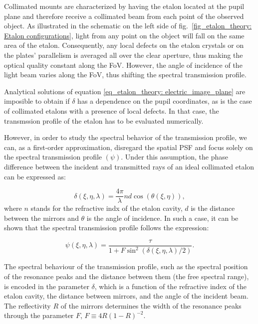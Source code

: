 Collimated mounts are characterized by having the etalon located at the pupil plane and therefore receive a collimated beam from each point of the observed object. As illustrated in the schematic on the left side of fig.~{\ref{fig_etalon_theory: Etalon configurations}}, light from any point on the object will fall on the same area of the etalon. Consequently, any local defects on the etalon crystals or on the plates' parallelism is averaged all over the clear aperture, thus making the optical quality constant along the FoV. However, the angle of incidence of the light beam varies along the FoV, thus shifting the spectral transmission profile.  

Analytical solutions of equation \eqref{eq_etalon_theory: electric_image_plane} are imposible to obtain if $\delta$ has a dependence on the pupil coordinates, as is the case of collimated etalons with a presence of local defects. In that case, the transmssion profile of the etalon has to be evaluated numerically. 

However, in order to study the spectral behavior of the transmission profile, we can, as a first-order approximation, disregard the spatial PSF and focus solely on the spectral transmission profile $(\psi)$. Under this assumption, the phase difference between the incident and transmitted rays of an ideal collimated etalon can be expressed as:  

\begin{equation}
  \delta (\xi, \eta, \lambda) = \frac{4\pi}{\lambda}nd\cos (\theta(\xi, \eta)),
  \label{eq_etalon_theory: collimated_delta}
\end{equation}
where $n$ stands for the refractive indx of the etalon cavity, $d$ is the distance between the mirrors and $\theta$ is the angle of incidence. In such a case, it can be shown that the spectral transmission profile follows the expression: 

\begin{equation}
  \psi\left(\xi, \eta, \lambda \right) = \frac{\tau}{1 + F \sin ^2 (\delta(\xi, \eta, \lambda) / 2)}.
  \label{eq_eta_theory : Collimated_profile}
\end{equation}

The spectral behaviour of the transmission profile, such as the spectral position of the resonance peaks and the distance between them (the free spectral range), is encoded in the parameter $\delta$, which is a function of the refractive index of the etalon cavity, the distance between mirrors, and the angle of the incident beam. The reflectivity $R$ of the mirrors determines the width of the resonance peaks through the parameter $F$, $F \equiv 4R (1 - R )^{-2}$.

